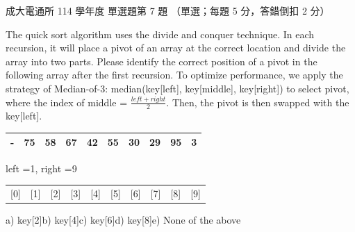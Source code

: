 \begin{pastexam}[label={px:ncku-114-cce-ds-07}]{成大電通所 114 學年度 單選題第 7 題}
（單選；每題 5 分，答錯倒扣 2 分）

The quick sort algorithm uses the divide and conquer technique. In each recursion, it will place a pivot of an
array at the correct location and divide the array into two parts. Please identify the correct position of a
pivot in the following array after the first recursion. To optimize performance, we apply the strategy of
Median-of-3: median(key[left], key[middle], key[right]) to select pivot, where the index of middle
= $\frac{left+right}{2}$. Then, the pivot is then swapped with the key[left].
\begin{center}
\begin{tabular}{*{10}{|c}|}\hline - & 75 & 58 & 67 & 42 & 55 & 30 & 29 & 95 & 3 \\ \hline\end{tabular}\quad left =1, right =9\\[-2pt]
{\small\begin{tabular}{*{10}{c}}[0]&[1]&[2]&[3]&[4]&[5]&[6]&[7]&[8]&[9]\end{tabular}}\hspace{8em}
\end{center}
a) key[2]\quad b) key[4]\quad c) key[6]\quad d) key[8]\quad e) None of the above
\end{pastexam}

